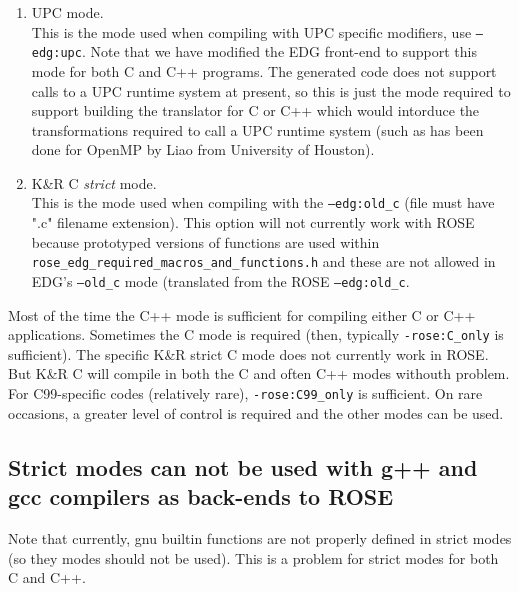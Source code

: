 \begin{enumerate}
   \item UPC mode. \\
        This is the mode used when compiling with UPC specific modifiers, use 
        {\tt --edg:upc}.  Note that we have modified the EDG front-end to support
        this mode for both C and C++ programs.  The generated code does not 
        support calls to a UPC runtime system at present, so this is just the 
        mode required to support building the translator for C or C++ which would
        intorduce the transformations required to call a UPC runtime system (such
        as has been done for OpenMP by Liao from University of Houston).

   \item K\&R C {\em strict} mode. \\
        This is the mode used when compiling with the {\tt --edg:old\_c} (file must have ".c"
        filename extension).  This option will not currently work with ROSE because 
        prototyped versions of functions are used within
        {\tt rose\_edg\_required\_macros\_and\_functions.h} and these are not allowed in EDG's
        {\tt --old\_c} mode (translated from the ROSE {\tt --edg:old\_c}.
\end{enumerate}

  Most of the time the C++ mode is sufficient for compiling either C or C++ 
applications.  Sometimes the C mode is required (then, typically {\tt -rose:C\_only} is
sufficient).  The specific K\&R strict C mode does not currently work in ROSE. But
K\&R C will compile in both the C and often C++ modes withouth problem. For 
C99-specific codes (relatively rare), {\tt -rose:C99\_only} is sufficient.  On rare 
occasions, a greater level of control is required and the other modes can be used.

\subsection{Strict modes can not be used with g++ and gcc compilers as back-ends to ROSE}
   Note that currently, gnu builtin functions are not properly defined in strict 
modes (so they modes should not be used).  This is a problem for strict modes for 
both C and C++.


